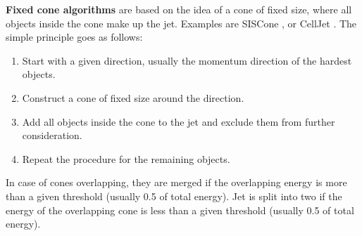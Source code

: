 \textbf{Fixed cone algorithms} are based on the idea of a cone of fixed size, where all objects inside the cone make up the jet.
Examples are SISCone \cite{siscone}, or CellJet \cite{pythia}.
The simple principle goes as follows:
\begin{enumerate}
    \item Start with a given direction, usually the momentum direction of the hardest objects.
    \item Construct a cone of fixed size around the direction.
    \item Add all objects inside the cone to the jet and exclude them from further consideration.
    \item Repeat the procedure for the remaining objects.
\end{enumerate}
In case of cones overlapping, they are merged if the overlapping energy is more than a given threshold (usually 0.5 of total energy).
Jet is split into two if the energy of the overlapping cone is less than a given threshold (usually 0.5 of total energy).

